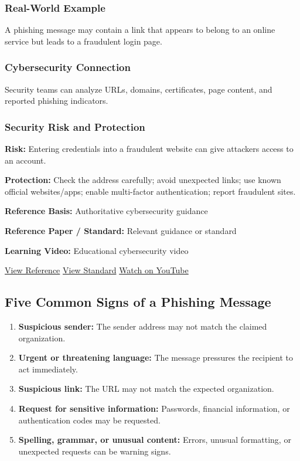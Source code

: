 \documentclass[12pt,a4paper]{article}
\newcommand{\refs}[3]{%
    \textbf{Reference Basis:} Authoritative cybersecurity guidance\par
    \textbf{Reference Paper / Standard:} Relevant guidance or standard\par
    \textbf{Learning Video:} Educational cybersecurity video\par
    \href{#1}{\textcolor{linkblue}{View Reference}}
    \quad
    \href{#2}{\textcolor{linkblue}{View Standard}}
    \quad
    \href{#3}{\textcolor{linkblue}{Watch on YouTube}}
}
\begin{document}
\subsubsection{Real-World Example}

A phishing message may contain a link that appears to belong to an online service but leads to a fraudulent login page.

\subsubsection{Cybersecurity Connection}

Security teams can analyze URLs, domains, certificates, page content, and reported phishing indicators.

\subsubsection{Security Risk and Protection}

\textbf{Risk:} Entering credentials into a fraudulent website can give attackers access to an account.

\textbf{Protection:} Check the address carefully; avoid unexpected links; use known official websites/apps; enable multi-factor authentication; report fraudulent sites.

\refs
{https://www.nist.gov/itl/smallbusinesscyber/guidance-topic/phishing}
{https://nvlpubs.nist.gov/nistpubs/TechnicalNotes/NIST.TN.2276.pdf}
{https://www.youtube.com/results?search_query=Professor+Messer+phishing}


\subsection{Five Common Signs of a Phishing Message}

\begin{enumerate}
    \item \textbf{Suspicious sender:}
    The sender address may not match the claimed organization.

    \item \textbf{Urgent or threatening language:}
    The message pressures the recipient to act immediately.

    \item \textbf{Suspicious link:}
    The URL may not match the expected organization.

    \item \textbf{Request for sensitive information:}
    Passwords, financial information, or authentication codes may be requested.

    \item \textbf{Spelling, grammar, or unusual content:}
    Errors, unusual formatting, or unexpected requests can be warning signs.
\end{enumerate}
\end{document}
